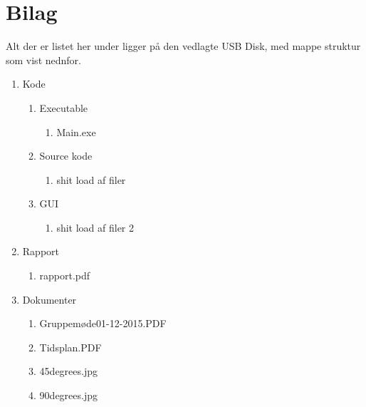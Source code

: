 \appendix
\section{Bilag} \hfill
Alt der er listet her under ligger på den vedlagte USB Disk, med mappe struktur som vist nednfor.
\label{sec:bilag}
\begin{enumerate}[noitemsep]
	\item Kode
	\begin{enumerate}[noitemsep]
		\item Executable
		\begin{enumerate}[noitemsep]
			\item Main.exe
		\end{enumerate}
		\item Source kode
		\begin{enumerate}[noitemsep]
			\item shit load af filer
		\end{enumerate}
		\item GUI
		\begin{enumerate}[noitemsep]
			\item shit load af filer 2
		\end{enumerate}
	\end{enumerate}
	\item Rapport
	\begin{enumerate}[noitemsep]
		\item rapport.pdf
	\end{enumerate}
	\item Dokumenter
	\begin{enumerate}[noitemsep]
		\item Gruppemøde01-12-2015.PDF \label{itm:Modereferat1}
		\item Tidsplan.PDF \label{itm:Tidsplan1}
		\item 45degrees.jpg \label{itm:45deg}
		\item 90degrees.jpg \label{itm:90deg}
	\end{enumerate}
\end{enumerate}